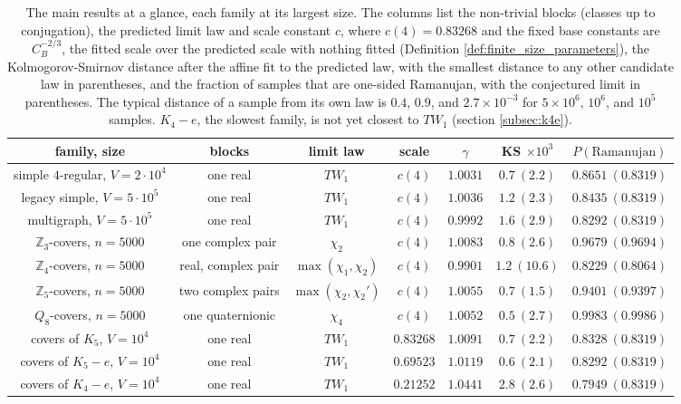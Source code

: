 \documentclass[12pt,oneside,english]{amsart}
\numberwithin{equation}{section}
\numberwithin{figure}{section}
\numberwithin{table}{section}
\theoremstyle{plain}
\numberwithin{thm}{section}
\theoremstyle{plain}
\theoremstyle{plain}
\theoremstyle{plain}
\theoremstyle{definition}
\theoremstyle{definition}
\theoremstyle{definition}
\theoremstyle{remark}
\providecommand{\tabularnewline}{\\}
\begin{document}
\begin{table}[tbp]
\begin{centering}
{\scriptsize\setlength{\tabcolsep}{2.5pt}
\begin{tabular}{|c|c|c|c|c|c|c|}
\hline
family, size & blocks & limit law & scale & $\gamma$ & KS $\times10^{3}$ & $P(\text{Ramanujan})$\tabularnewline
\hline
simple $4$-regular, $V=2\cdot10^{4}$ & one real & $TW_{1}$ & $c(4)$ & $1.0031$ & $0.7\ (2.2)$ & $0.8651\ (0.8319)$\tabularnewline
\hline
legacy simple, $V=5\cdot10^{5}$ & one real & $TW_{1}$ & $c(4)$ & $1.0036$ & $1.2\ (2.3)$ & $0.8435\ (0.8319)$\tabularnewline
\hline
multigraph, $V=5\cdot10^{5}$ & one real & $TW_{1}$ & $c(4)$ & $0.9992$ & $1.6\ (2.9)$ & $0.8292\ (0.8319)$\tabularnewline
\hline
$\mathbb{Z}_{3}$-covers, $n=5000$ & one complex pair & $\chi_{2}$ & $c(4)$ & $1.0083$ & $0.8\ (2.6)$ & $0.9679\ (0.9694)$\tabularnewline
\hline
$\mathbb{Z}_{4}$-covers, $n=5000$ & real, complex pair & $\max(\chi_{1},\chi_{2})$ & $c(4)$ & $0.9901$ & $1.2\ (10.6)$ & $0.8229\ (0.8064)$\tabularnewline
\hline
$\mathbb{Z}_{5}$-covers, $n=5000$ & two complex pairs & $\max(\chi_{2},\chi_{2}')$ & $c(4)$ & $1.0055$ & $0.7\ (1.5)$ & $0.9401\ (0.9397)$\tabularnewline
\hline
$Q_{8}$-covers, $n=5000$ & one quaternionic & $\chi_{4}$ & $c(4)$ & $1.0052$ & $0.5\ (2.7)$ & $0.9983\ (0.9986)$\tabularnewline
\hline
covers of $K_{5}$, $V=10^{4}$ & one real & $TW_{1}$ & $0.83268$ & $1.0091$ & $0.7\ (2.2)$ & $0.8328\ (0.8319)$\tabularnewline
\hline
covers of $K_{5}-e$, $V=10^{4}$ & one real & $TW_{1}$ & $0.69523$ & $1.0119$ & $0.6\ (2.1)$ & $0.8292\ (0.8319)$\tabularnewline
\hline
covers of $K_{4}-e$, $V=10^{4}$ & one real & $TW_{1}$ & $0.21252$ & $1.0441$ & $2.8\ (2.6)$ & $0.7949\ (0.8319)$\tabularnewline
\hline
\end{tabular}}
\par\end{centering}
\caption{\label{tab:summary}The main results at a glance, each family at
its largest size. The columns list the non-trivial blocks (classes
up to conjugation), the predicted limit law and scale constant $c$,
where $c(4)=0.83268$ and the fixed base constants are $C_{B}^{-2/3}$,
the fitted scale over the predicted scale with nothing fitted (Definition
\ref{def:finite_size_parameters}), the Kolmogorov-Smirnov distance
after the affine fit to the predicted law, with the smallest distance
to any other candidate law in parentheses, and the fraction of samples
that are one-sided Ramanujan, with the conjectured limit in parentheses.
The typical distance of a sample from its own law is $0.4$, $0.9$,
and $2.7\times10^{-3}$ for $5\times10^{6}$, $10^{6}$, and $10^{5}$
samples. $K_{4}-e$, the slowest family, is not yet closest to $TW_{1}$
(section \ref{subsec:k4e}).}
\end{table}
\end{document}
